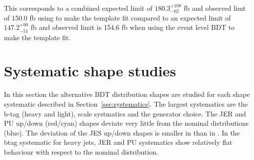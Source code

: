 This corresponds to a combined expected limit of $180.3^{+108}_{-62}$ fb and observed limt of 150.0 fb using \HT to make the template fit compared to an expected limit of $147.2^{+90}_{-51}$ fb and observed limit is 154.6 fb when using the event level BDT to make the template fit.

\section{Systematic shape studies}

In this section the alternative BDT distribution shapes are studied for each shape systematic described in Section~\ref{sec:systematics}. The largest systematics are the b-tag (heavy and light), scale systmatics and the \ttbar generator choice. The JER and PU up/down (red/cyan) shapes deviate very little from the nominal distributions (blue). The deviation of the JES up/down shapes is smaller in \ttbar than in \tttt. In \ttbar the btag systematic for heavy jets, JER and PU systematics show relatively flat behaviour with respect to the nominal distribution.

